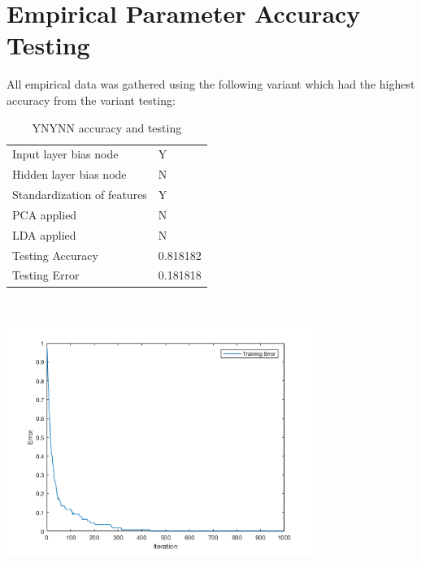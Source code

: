 \documentclass[12pt]{article}
\newcommand{\accuracyAndTestErrorTable}[8]{
  \begin{tabular}{l|l}
    \hline
    Input layer bias node & #1 \\
    Hidden layer bias node & #2 \\
    Standardization of features & #3 \\
    PCA applied & #4 \\
    LDA applied & #5 \\
    \hline
    Testing Accuracy & #6 \\
    Testing Error & #7 \\
    \hline
  \end{tabular}
  ~\\[60pt]
  \caption{#8}
}
\begin{document}

\section{Empirical Parameter Accuracy Testing}
All empirical data was gathered using the following variant which had the highest accuracy from the variant testing:
\begin{center}
  \begin{table}[H]
    \begin{varwidth}[b]{0.4\linewidth}
      \centering
      \accuracyAndTestErrorTable{Y}{N}{Y}{N}{N}{0.818182}{0.181818}{YNYNN accuracy and testing}
      \label{table:param_base}
    \end{varwidth}%
    \hfill
    \begin{minipage}[b]{0.6\linewidth}
      \centering
      \includegraphics[width=100mm]{YNYNN_training_error.png}
      \label{fig:param_base}
    \end{minipage}
  \end{table}
\end{center}
\end{document}
